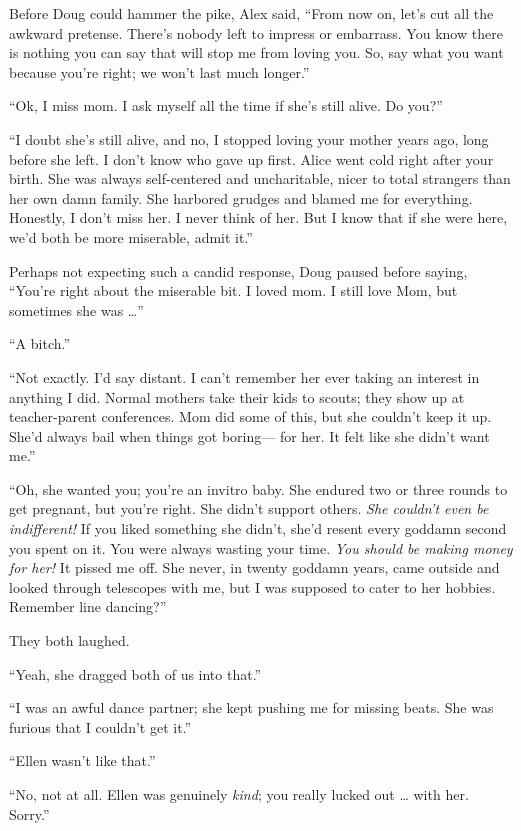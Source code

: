Before Doug could hammer the pike, Alex said, ``From now on, let's cut
all the awkward pretense. There's nobody left to impress or embarrass.
You know there is nothing you can say that will stop me from loving you.
So, say what you want because you're right; we won't last much longer.''

``Ok, I miss mom. I ask myself all the time if she's still alive. Do
you?''

``I doubt she's still alive, and no, I stopped loving your mother years
ago, long before she left. I don't know who gave up first. Alice went
cold right after your birth. She was always self-centered and
uncharitable, nicer to total strangers than her own damn family. She
harbored grudges and blamed me for everything. Honestly, I don't miss
her. I never think of her. But I know that if she were here, we'd both
be more miserable, admit it.''

Perhaps not expecting such a candid response, Doug paused before saying,
``You're right about the miserable bit. I loved mom. I still love Mom,
but sometimes she was \ldots''

``A bitch.''

``Not exactly. I'd say distant. I can't remember her ever taking an
interest in anything I did. Normal mothers take their kids to scouts;
they show up at teacher-parent conferences. Mom did some of this, but
she couldn't keep it up. She'd always bail when things got boring--- for
her. It felt like she didn't want me.''

``Oh, she wanted you; you're an invitro baby. She endured two or three
rounds to get pregnant, but you're right. She didn't support others.
\emph{She couldn't even be indifferent!} If you liked something she
didn't, she'd resent every goddamn second you spent on it. You were
always wasting your time. \emph{You should be making money for her!} It
pissed me off. She never, in twenty goddamn years, came outside and
looked through telescopes with me, but I was supposed to cater to her
hobbies. Remember line dancing?''

They both laughed.

``Yeah, she dragged both of us into that.''

``I was an awful dance partner; she kept pushing me for missing beats.
She was furious that I couldn't get it.''

``Ellen wasn't like that.''

``No, not at all. Ellen was genuinely \emph{kind}; you really lucked out
\ldots{} with her. Sorry.''

